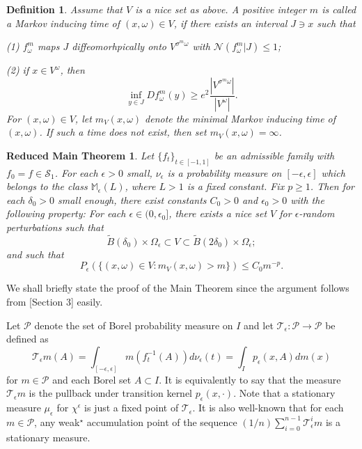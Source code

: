 \documentclass[11pt,oneside]{article}
\newtheorem{definition}{Definition}[section]
\theoremstyle{plain}
\newtheorem*{thmR}{Reduced Main Theorem}
\numberwithin{equation}{section}
\numberwithin{figure}{section}
\numberwithin{table}{section}
\begin{document}
\begin{definition}

Assume that $V$ is a nice set as above. A positive integer $m$ is called a Markov inducing time of $(x, \omega)\in V$, if there exists an interval $J \ni x$ such that

(1) $f_{\omega}^m$ maps $J$ diffeomorhpically onto $V^{\sigma^m \omega}$ with $\mathcal N(f_{\omega}^m|J) \leq 1$;

(2) if $x \in V^{\omega}$, then 
\[
\inf_{y \in J} Df_{\omega}^m (y) \geq e^2 \frac{|V^{\sigma^m \omega}|}{|V^{\omega}|}.
\]
For $(x, \omega) \in V$, let $m_V(x, \omega)$ denote the minimal Markov inducing time of $(x, \omega)$. If such a time does not exist, then set $m_V(x, \omega) = \infty$.
\end{definition}



\begin{thmR}
Let $\{f_t \}_{t \in [-1, 1]} $ be an admissible family with $f_0 =f \in \mathcal S_1$. For each $\epsilon > 0$ small, $\nu_{\epsilon}$ is a probability measure on $[-\epsilon, \epsilon]$ which belongs to the class $\mathbb M_{\epsilon}(L)$, where $L > 1$ is a fixed constant. Fix $p \geq 1$. Then for each $\delta_0 > 0$ small enough, there exist constants $C_0 > 0$ and $\epsilon_0 > 0$ with the following property: For each $\epsilon \in (0, \epsilon_0]$, there exists a nice set $V$ for $\epsilon$-random perturbations such that
\[
\tilde B(\delta_0) \times \Omega_{\epsilon} \subset V \subset \tilde B(2\delta_0) \times \Omega_{\epsilon};
\]
and such that 
\[
P_{\epsilon} (\{ (x, \omega) \in V: m_V(x, \omega) >m \}) \leq C_0 m^{-p}. 
\]

\end{thmR}


We shall briefly state the proof of the Main Theorem since the argument follows from \cite{S}[Section 3] easily. 


Let $\mathcal P$ denote the set of Borel probability measure on $I$ and let $\mathcal T_{\epsilon} : \mathcal P \to \mathcal P$ be defined as 
\[
\mathcal T_{\epsilon} m(A) = \int_{[-\epsilon, \epsilon]} m(f_t^{-1}(A)) d \nu_{\epsilon} (t)  = \int_I p_{\epsilon} (x, A) d m(x)
\]
for $m \in \mathcal P$ and each Borel set $A \subset I$. It is equivalently to say that the measure $\mathcal T_{\epsilon} m$ is the pullback under transition kernel $p_{\epsilon}(x, \cdot)$. Note that a stationary measure $\mu_{\epsilon}$ for $\chi^{\epsilon}$ is just a fixed point of $\mathcal T_{\epsilon}$. It is also well-known that for each $m \in \mathcal P$, any weak$^{\star}$ accumulation point of the sequence $(1/n) \sum_{i=0}^{n-1} \mathcal T_{\epsilon}^i m$ is a stationary measure.
\end{document}

